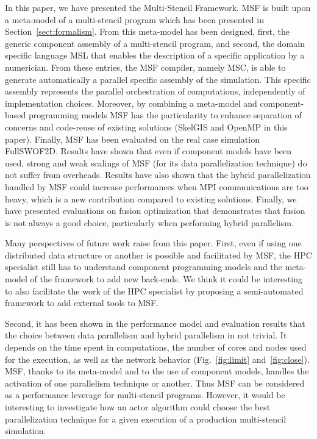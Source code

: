 In this paper, we have presented the Multi-Stencil Framework. MSF is built upon a meta-model of a multi-stencil program which has been presented in Section~\ref{sect:formalism}. From this meta-model has been designed, first, the generic component assembly of a multi-stencil program, and second, the domain specific language MSL that enables the description of a specific application by a numerician. From these entries, the MSF compiler, namely MSC, is able to generate automatically a parallel specific assembly of the simulation. This specific assembly represents the parallel orchestration of computations, independently of implementation choices. Moreover, by combining a meta-model and component-based programming models MSF has the particularity to enhance separation of concerns and code-reuse of existing solutions (\eg SkelGIS and OpenMP in this paper). Finally, MSF has been evaluated on the real case simulation FullSWOF2D. Results have shown that even if component models have been used, strong and weak scalings of MSF (for its data parallelization technique) do not suffer from overheads. Results have also shown that the hybrid parallelization handled by MSF could increase performances when MPI communications are too heavy, which is a new contribution compared to existing solutions. Finally, we have presented evaluations on fusion optimization that demonstrates that fusion is not always a good choice, particularly when performing hybrid parallelism.

Many perspectives of future work raise from this paper. First, even if using one distributed data structure or another is possible and facilitated by MSF, the HPC specialist still has to understand component programming models and the meta-model of the framework to add new back-ends. We think it could be interesting to also facilitate the work of the HPC specialist by proposing a semi-automated framework to add external tools to MSF.

Second, it has been shown in the performance model and evaluation results that the choice between data parallelism and hybrid parallelism in not trivial. It depends on the time spent in computations, the number of cores and nodes used for the execution, as well as the network behavior (Fig.~\ref{fig:limit} and~\ref{fig:close}). MSF, thanks to its meta-model and to the use of component models, handles the activation of one parallelism technique or another. Thus MSF can be considered as a performance leverage for multi-stencil programs. However, it would be interesting to investigate how an actor algorithm could choose the best parallelization technique for a given execution of a production multi-stencil simulation.

